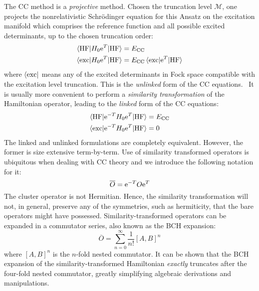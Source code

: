 The \acs{CC} method is a \emph{projective} method. Chosen the truncation
level $\mathcal{M}$, one projects the nonrelativistic Schrödinger
equation for this Ansatz on the excitation manifold which comprises the
reference function and all possible excited determinants, up to the
chosen truncation order:
\begin{subequations}
  \begin{align}
    \braket{\mathrm{HF} | H_0\mathrm{e}^{T} | \mathrm{HF}} &= E_\mathrm{CC} \\
    \braket{\mathrm{exc} | H_0\mathrm{e}^{T} | \mathrm{HF}} &=
    E_\mathrm{CC}\braket{\mathrm{exc} | \mathrm{e}^{T} | \mathrm{HF}}
  \end{align}
\end{subequations}
where $\bra{\mathrm{exc}}$ means any of the excited determinants in Fock
space compatible with the excitation level truncation.
This is the \emph{unlinked} form of the \acs{CC}
equations.~\autocite{Helgaker2000-tz} It is usually more convenient to
perform a \emph{similarity transformation} of the Hamiltonian operator,
leading to the \emph{linked} form of the \acs{CC} equations:
\begin{subequations}
  \begin{align}
    \braket{\mathrm{HF} | \mathrm{e}^{-T}H_0\mathrm{e}^{T} | \mathrm{HF}} &= E_\mathrm{CC} \\
    \braket{\mathrm{exc} | \mathrm{e}^{-T}H_0\mathrm{e}^{T} | \mathrm{HF}} &= 0
  \end{align}
\end{subequations}
The linked and unlinked formulations are completely equivalent. However,
the former is size extensive term-by-term.
Use of similarity transformed operators is ubiquitous when dealing with
\acs{CC} theory and we introduce the following notation for it:
\begin{equation}
  \overline{O} =\mathrm{e}^{-T}O\mathrm{e}^{T}
\end{equation}
The cluster operator is not Hermitian. Hence, the similarity transformation
will not, in general, preserve any of the symmetries, such as
hermiticity, that the bare operators might have possessed.
Similarity-transformed operators can be expanded in a commutator series,
also known as the \ac{BCH} expansion:
\begin{equation}
  \overline{O} =
  \sum_{n=0}^{\infty}\frac{1}{n!}[A, B]^n
\end{equation}
where $[A,B]^n$ is the $n$-fold nested commutator. It can be shown that
the \acs{BCH} expansion of the similarity-transformed Hamiltonian
\emph{exactly} truncates after the four-fold nested commutator, greatly
simplifying algebraic derivations and manipulations.

